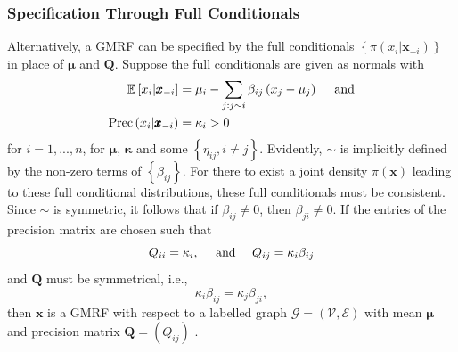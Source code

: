 \subsubsection{Specification Through Full Conditionals}
Alternatively, a GMRF can be specified by the full conditionals $\left\lbrace\pi\left(x_i|\pmb{x}_{-i}\right)\right\rbrace$ in place of $\pmb{\mu}$ and $\pmb{Q}$. Suppose the full conditionals are given as normals with
\begin{align}
    \mathbb{E}\left[x_i|\pmb{x}_{-i}\right] &= \mu_i-\sum_{j:j\sim i}\beta_{ij}\left(x_j-\mu_j\right)\hspace{10pt}\hbox{ and}\\
    \hbox{Prec}\left(x_i|\pmb{x}_{-i}\right) &= \kappa_i>0
\end{align}
for $i=1,...,n$, for $\pmb{\mu}$, $\pmb{\kappa}$ and some $\left\lbrace\eta_{ij},i\neq j\right\rbrace$. Evidently, $\sim$ is implicitly defined by the non-zero terms of $\left\lbrace\beta_{ij}\right\rbrace$. For there to exist a joint density $\pi\left(\pmb{x}\right)$ leading to these full conditional distributions, these full conditionals must be consistent. Since $\sim$ is symmetric, it follows that if $\beta_{ij}\neq 0$, then $\beta_{ji}\neq0$. If the entries of the precision matrix are chosen such that
\begin{equation*}
    Q_{ii}=\kappa_i, \hspace{10pt}\hbox{ and }\hspace{10pt} Q_{ij}=\kappa_i\beta_{ij}
\end{equation*}
and $\pmb{Q}$ must be symmetrical, i.e.,
\begin{equation*}
    \kappa_i\beta_{ij}=\kappa_j\beta_{ji},
\end{equation*}
then $\pmb{x}$ is a GMRF with respect to a labelled graph $\mathcal{G}=\left(\mathcal{V}, \mathcal{E}\right)$ with mean $\pmb{\mu}$ and precision matrix $\pmb{Q}=\left(Q_{ij}\right)$ \autocite[][27]{rue2005gaussian}.
